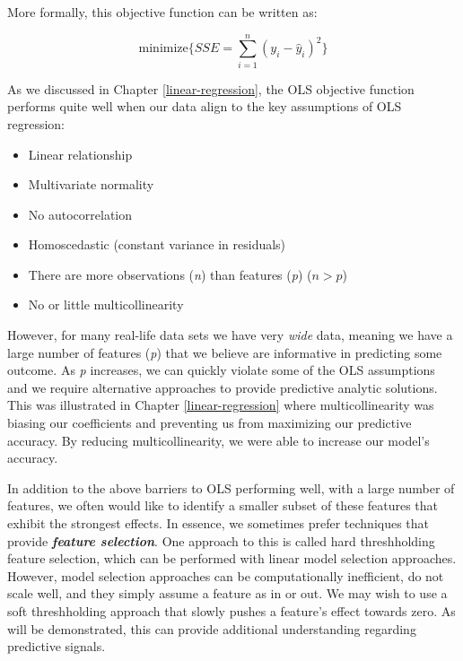 \documentclass[]{book}
\providecommand{\tightlist}{%
  \setlength{\itemsep}{0pt}\setlength{\parskip}{0pt}}
\theoremstyle{definition}
\theoremstyle{definition}
\theoremstyle{definition}
\theoremstyle{remark}
\begin{document}
More formally, this objective function can be written as:

\begin{equation}
\label{eq:ols-objective}
\text{minimize} \bigg \{ SSE = \sum^n_{i=1} (y_i - \hat{y}_i)^2 \bigg \}
\end{equation}

As we discussed in Chapter \ref{linear-regression}, the OLS objective
function performs quite well when our data align to the key assumptions
of OLS regression:

\begin{itemize}
\tightlist
\item
  Linear relationship
\item
  Multivariate normality
\item
  No autocorrelation
\item
  Homoscedastic (constant variance in residuals)
\item
  There are more observations (\emph{n}) than features (\emph{p})
  (\(n > p\))
\item
  No or little multicollinearity
\end{itemize}

However, for many real-life data sets we have very \emph{wide} data,
meaning we have a large number of features (\emph{p}) that we believe
are informative in predicting some outcome. As \emph{p} increases, we
can quickly violate some of the OLS assumptions and we require
alternative approaches to provide predictive analytic solutions. This
was illustrated in Chapter \ref{linear-regression} where
multicollinearity was biasing our coefficients and preventing us from
maximizing our predictive accuracy. By reducing multicollinearity, we
were able to increase our model's accuracy.

In addition to the above barriers to OLS performing well, with a large
number of features, we often would like to identify a smaller subset of
these features that exhibit the strongest effects. In essence, we
sometimes prefer techniques that provide \textbf{\emph{feature
selection}}. One approach to this is called hard threshholding feature
selection, which can be performed with linear model selection
approaches. However, model selection approaches can be computationally
inefficient, do not scale well, and they simply assume a feature as in
or out. We may wish to use a soft threshholding approach that slowly
pushes a feature's effect towards zero. As will be demonstrated, this
can provide additional understanding regarding predictive signals.
\end{document}
